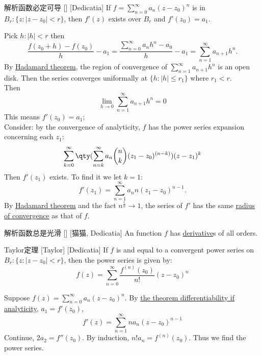 \documentclass[UTF8]{ctexart}
\begin{document}
        \begin{ppt}
            []
            {解析函数必定可导}
            []
            [Dedicatia]
            If $f=\sum\limits_{n=0}^{\infty}a_n(z-z_0)^n$ is  in $B_r:\{z:|z-z_0|<r\}$, then $f'(z)$ exists over $B_r$ and $f'(z_0)=a_1$.
        \end{ppt}

        \begin{prf}
            Pick $h:|h|<r$ then
            \[\frac{f(z_0+h)-f(z_0)}{h}-a_1=\frac{\sum\limits_{n=0}^{\infty}a_nh^n-a_0}{h}-a_1=\sum_{n=1}^{\infty}a_{n+1}h^n.\]
            By \hyperref[thm:Hadamard]{Hadamard theorem}, the region of convergence of $\sum\limits_{n=1}^{\infty}a_{n+1}h^n$ is an open disk. Then the series converges uniformally at $\{h:|h|\leq r_1\}$ where $r_1<r$.\\
            Then
            \[\lim_{h\to 0}\sum_{n=1}^{\infty}a_{n+1}h^n=0 \]
            This means $f'(z_0)=a_1$;\\
            Consider: by the convergence of analyticity, $f$ has the power series expansion concerning each $z_1$:
            \[\sum_{k=0}^{\infty}\qty(\sum_{n=k}^{\infty}a_n\binom{n}{k}(z_1-z_0)^{(n-k)})(z-z_1)^k\]
            Then $f'(z_1)$ exists. To find it we let $k=1$:
            \[f'(z_1)=\sum_{n=1}^{\infty}a_nn(z_1-z_0)^{n-1}.\]
            By \hyperref[thm:Hadamard]{Hadamard theorem} and the fact $n^{\frac{1}{n}}\to 1$, the series of $f'$ has the same \hyperref[dfn:Hadamard]{radius of convergence} as that of $f$.
        \end{prf}
        
        \begin{ppt}
            []
            {解析函数总是光滑}
            []
            [猫猫, Dedicatia]
            An  function $f$ has \hyperref[dfn:Complex-Derivative]{derivative}s of all orders.
        \end{ppt}

        \begin{thm}
            [Taylor]
            {Taylor定理}
            [Taylor]
            [Dedicatia]
            If $f$ is  and equal to a convergent power series on $B_r:\{z:|z-z_0|<r\}$, then the power series is given by:
            \[f(z)=\sum_{n=0}^{\infty}\frac{f^{(n)}(z_0)}{n!}(z-z_0)^n\]
        \end{thm}

        \begin{prf}
            Suppose $f(z)=\sum\limits_{n=0}^{\infty}a_n(z-z_0)^n$. By \hyperref[thm:Differentiability if Analyticity]{the theorem differentiability if analyticity}, $a_1=f'(z_0)$, 
            \[f'(z)=\sum_{n=1}^{\infty}na_n(z-z_0)^{n-1}\]
            Continue, $2a_2=f''(z_0)$. By induction, $n!a_n=f^{(n)}(z_0)$. Thus we find the power series.
        \end{prf}
\end{document}
